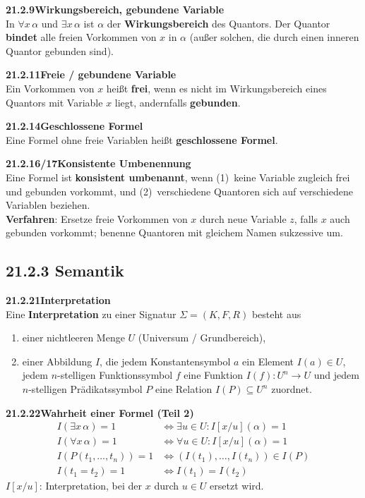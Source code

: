 \documentclass[a4paper,12pt]{article}
\newcommand{\gentry}[3]{%
  \noindent\textbf{#1\quad #2}\nopagebreak\\[0.2em]
  #3\par\smallskip
}
\begin{document}
\gentry{21.2.9}{Wirkungsbereich, gebundene Variable}{%
  In $\forall x\,\alpha$ und $\exists x\,\alpha$ ist $\alpha$ der
  \textbf{Wirkungsbereich} des Quantors. Der Quantor \textbf{bindet} alle freien
  Vorkommen von $x$ in $\alpha$ (außer solchen, die durch einen inneren Quantor
  gebunden sind).
}

\gentry{21.2.11}{Freie / gebundene Variable}{%
  Ein Vorkommen von $x$ heißt \textbf{frei}, wenn es nicht im Wirkungsbereich
  eines Quantors mit Variable $x$ liegt, andernfalls \textbf{gebunden}.
}

\gentry{21.2.14}{Geschlossene Formel}{%
  Eine Formel ohne freie Variablen heißt \textbf{geschlossene Formel}.
}

\gentry{21.2.16/17}{Konsistente Umbenennung}{%
  Eine Formel ist \textbf{konsistent umbenannt}, wenn (1)~keine Variable zugleich
  frei und gebunden vorkommt, und (2)~verschiedene Quantoren sich auf verschiedene
  Variablen beziehen.\\
  \textbf{Verfahren}: Ersetze freie Vorkommen von $x$ durch neue Variable $z$,
  falls $x$ auch gebunden vorkommt; benenne Quantoren mit gleichem Namen sukzessive um.
}

\subsection*{21.2.3 Semantik}

\gentry{21.2.21}{Interpretation}{%
  Eine \textbf{Interpretation} zu einer Signatur $\Sigma = (K, F, R)$ besteht aus
  \begin{enumerate}[label=(\alph*),topsep=2pt,itemsep=1pt]
    \item einer nichtleeren Menge $U$ (Universum / Grundbereich),
    \item einer Abbildung $I$, die jedem Konstantensymbol $a$ ein Element $I(a) \in U$,
          jedem $n$-stelligen Funktionssymbol $f$ eine Funktion $I(f): U^n \to U$ und
          jedem $n$-stelligen Prädikatssymbol $P$ eine Relation $I(P) \subseteq U^n$ zuordnet.
  \end{enumerate}
}

\gentry{21.2.22}{Wahrheit einer Formel (Teil 2)}{%
  \[
  \begin{array}{ll}
    I(\exists x\,\alpha) = 1 & \Leftrightarrow \exists u \in U: I[x/u](\alpha)=1\\
    I(\forall x\,\alpha) = 1 & \Leftrightarrow \forall u \in U: I[x/u](\alpha)=1\\
    I(P(t_1,\ldots,t_n)) = 1 & \Leftrightarrow (I(t_1),\ldots,I(t_n)) \in I(P)\\
    I(t_1 = t_2) = 1 & \Leftrightarrow I(t_1) = I(t_2)
  \end{array}
  \]
  $I[x/u]$: Interpretation, bei der $x$ durch $u \in U$ ersetzt wird.
}
\end{document}
